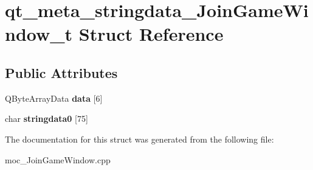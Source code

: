 \hypertarget{structqt__meta__stringdata__JoinGameWindow__t}{}\section{qt\+\_\+meta\+\_\+stringdata\+\_\+\+Join\+Game\+Window\+\_\+t Struct Reference}
\label{structqt__meta__stringdata__JoinGameWindow__t}
\subsection*{Public Attributes}
\begin{DoxyCompactItemize}
\item 
\mbox{\label{structqt__meta__stringdata__JoinGameWindow__t_a5b2769cce994e983dc572825aa74ab2c}} 
Q\+Byte\+Array\+Data {\bfseries data} \mbox{[}6\mbox{]}
\item 
\mbox{\label{structqt__meta__stringdata__JoinGameWindow__t_a5128f2e8e8ac0c44667ea31e471b4fbe}} 
char {\bfseries stringdata0} \mbox{[}75\mbox{]}
\end{DoxyCompactItemize}


The documentation for this struct was generated from the following file\+:\begin{DoxyCompactItemize}
\item 
moc\+\_\+\+Join\+Game\+Window.\+cpp\end{DoxyCompactItemize}
